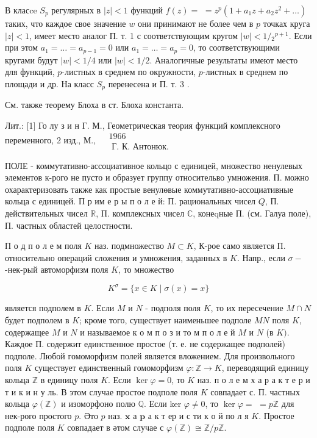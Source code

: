 \documentclass[10pt]{article}
\begin{document}
В класce $S_{p}$ регулярных в $|z|<1$ функций $f(z)=$ $=z^{p}\left(1+a_{1} z+a_{2} z^{2}+\ldots\right)$ таких, что каждое свое значение $w$ они принимают не более чем в $p$ точках круга $|z|<1$, имеет место аналог П. т. 1 с соответствующим кругом $|w|<1 /{ }_{2}{ }^{p+1}$. Если при этом $a_{1}=\ldots=a_{p-1}=0$ или $a_{1}=\ldots=a_{p}=0$, то соответствующими кругами будут $|w|<1 / 4$ или $|w|<1 / 2$. Аналогичные результаты имеют место для функций, $p$-листных в среднем по окружности, $p$-листных в среднем по площади и др. На класс $S_{p}$ перенесена и П. т. 3 .



См. также теорему Блоха в ст. Блоха константа.



Лит.: [1] Го лу з и н Г. М., Геометрическая теория функций комплексного переменного, 2 изд., М., $\begin{aligned} & 1966 \\ & \text { Г. К. Антонюк. }\end{aligned}$



ПОЛЕ - коммутативно-ассоциативное кольцо с единицей, множество ненулевых элементов к-рого не пусто и образует группу относительво умножения. П. можно охарактеризовать также как простые венулөвые коммутативно-ассоциативные кольца с единицей. П р им е р ы п о л е й: П. рациональных чисел $Q$, П. действительных чисел $\mathbb{R}$, П. комплексных чисел $\mathbb{C}$, конеqные П. (см. Галуа поле), П. частных областей целостности.



П о д п о л е м поля $K$ наз. подмножество $M \subset K$, К-рое само является П. относительно операций сложения и умножения, заданных в $K$. Напр., если $\sigma-$-нек-рый автоморфизм поля $K$, то множество



\[

K^{\sigma}=\{x \in K \mid \sigma(x)=x\}

\]



является подполем в $K$. Если $M$ и $N$ - подполя поля $K$, то их пересечение $M \cap N$ будет подполем в $K$; кроме того, существует наименьшее подполе $M N$ поля $K$, содержащее $M$ и $N$ и называемое к о м п о з и то м п о л е й $M$ и $N$ (в $K)$. Каждое П. содержит единственное простое (т. е. не содержащее подполей) подполе. Любой гомоморфизм полей является вложением. Для произвольного поля $K$ существует единственный гомоморфизм $\varphi: \mathbb{Z} \rightarrow K$, переводящий единицу кольца $\mathbb{Z}$ в единицу поля $K$. Если $\operatorname{ker} \varphi=0$, то $K$ наз. п о л е м х а р а к т е р и т и к и н у ль. В этом случае простое подполе поля $K$ совпадает с. П. частных кольца $\varphi(\mathbb{Z})$ и изоморфоно полю $\mathbb{Q}$. Если ker $\varphi \neq 0$, то $\operatorname{ker} \varphi=$ $=p \mathbb{Z}$ для нек-рого простого $p$. Әто $p$ наз. $\mathbf{x}$ а $\mathbf{p}$ а к т ер и с ти к о й по л я $K$. Простое подполе поля $K$ совпадает в әтом случае с $\varphi(\mathbb{Z}) \cong \mathbb{Z} / p \mathbb{Z}$.
\end{document}
